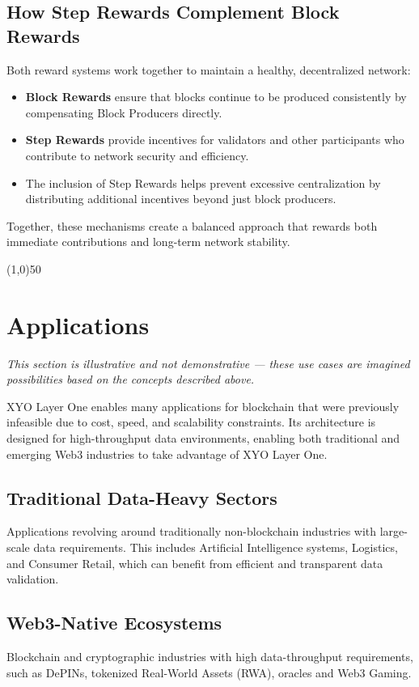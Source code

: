 \documentclass{article}
\begin{document}
\subsection{How Step Rewards Complement Block Rewards}

Both reward systems work together to maintain a healthy, decentralized network:
\begin{itemize}
    \item \textbf{Block Rewards} ensure that blocks continue to be produced consistently by compensating Block Producers directly.
    \item \textbf{Step Rewards} provide incentives for validators and other participants who contribute to network security and efficiency.
    \item The inclusion of Step Rewards helps prevent excessive centralization by
          distributing additional incentives beyond just block producers.
\end{itemize}

Together, these mechanisms create a balanced approach that rewards both
immediate contributions and long-term network stability.

\begin{center}
\line(1,0){50}
\end{center}

\section{Applications}
\textit{This section is illustrative and not demonstrative — these use cases are imagined possibilities based on the concepts described above.}

XYO Layer One enables many applications for blockchain that were previously infeasible due to cost, speed, and scalability constraints. Its architecture is designed for high-throughput data environments, enabling both traditional and emerging Web3 industries to take advantage of XYO Layer One.

\subsection{Traditional Data-Heavy Sectors}
Applications revolving around traditionally non-blockchain industries with large-scale data requirements. This includes Artificial Intelligence systems, Logistics, and Consumer Retail, which can benefit from efficient and transparent data validation.

\subsection{Web3-Native Ecosystems}
Blockchain and cryptographic industries with high data-throughput requirements, such as DePINs, tokenized Real-World Assets (RWA), oracles and Web3 Gaming.
\end{document}
